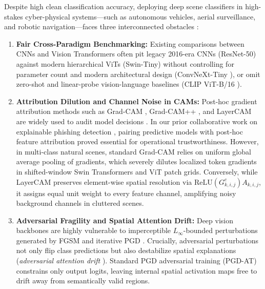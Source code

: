 \documentclass[final,5p,times,twocolumn]{elsarticle}
\begin{document}
Despite high clean classification accuracy, deploying deep scene classifiers in high-stakes cyber-physical systems---such as autonomous vehicles, aerial surveillance, and robotic navigation---faces three interconnected obstacles \cite{antamis2024interpretability,tang2024adversarial}:
\begin{enumerate}
    \item \textbf{Fair Cross-Paradigm Benchmarking:} Existing comparisons between CNNs and Vision Transformers often pit legacy 2016-era CNNs (ResNet-50) against modern hierarchical ViTs (Swin-Tiny) without controlling for parameter count and modern architectural design (ConvNeXt-Tiny \cite{liu2022convnet}), or omit zero-shot and linear-probe vision-language baselines (CLIP ViT-B/16 \cite{radford2021learning}).
    \item \textbf{Attribution Dilution and Channel Noise in CAMs:} Post-hoc gradient attribution methods such as Grad-CAM \cite{selvaraju2017grad}, Grad-CAM++ \cite{chattopadhay2018grad}, and LayerCAM \cite{jiang2021layercam} are widely used to audit model decisions \cite{antamis2024interpretability}. In our prior collaborative work on explainable phishing detection \cite{tulla2025phishing}, pairing predictive models with post-hoc feature attribution proved essential for operational trustworthiness. However, in multi-class natural scenes, standard Grad-CAM relies on uniform global average pooling of gradients, which severely dilutes localized token gradients in shifted-window Swin Transformers and ViT patch grids. Conversely, while LayerCAM \cite{jiang2021layercam} preserves element-wise spatial resolution via $\text{ReLU}(G_{k,i,j}^c) A_{k,i,j}$, it assigns equal unit weight to every feature channel, amplifying noisy background channels in cluttered scenes.
    \item \textbf{Adversarial Fragility and Spatial Attention Drift:} Deep vision backbones are highly vulnerable to imperceptible $L_\infty$-bounded perturbations generated by FGSM \cite{goodfellow2015explaining} and iterative PGD \cite{madry2018towards,sun2023multiobjective,apedo2025crack}. Crucially, adversarial perturbations not only flip class predictions but also destabilize spatial explanations (\emph{adversarial attention drift} \cite{ghorbani2019interpretation}). Standard PGD adversarial training (PGD-AT) \cite{madry2018towards} constrains only output logits, leaving internal spatial activation maps free to drift away from semantically valid regions.
\end{enumerate}
\end{document}
